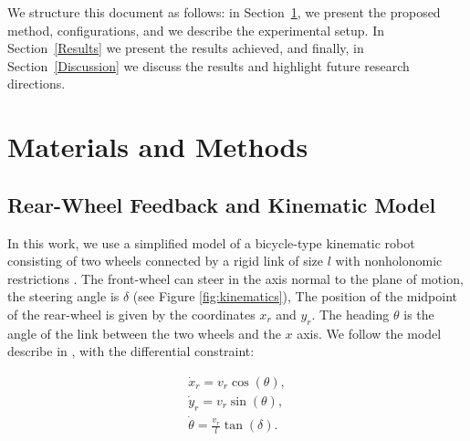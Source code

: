 \documentclass[symmetry,article,submit,moreauthors,pdftex]{Definitions/mdpi}
\begin{document}
We structure this document as follows: in Section~\ref{MatAndMethods}, we
present the proposed method, configurations, and we describe the experimental
setup. In Section~\ref{Results} we present the results achieved, and finally,
in Section~\ref{Discussion} we discuss the results and highlight future
research directions.

 
\section{Materials and Methods}\label{MatAndMethods}

\subsection{Rear-Wheel Feedback and Kinematic Model}\label{sec:kinematic}

In this work, we use a simplified model of a bicycle-type kinematic robot
consisting of two wheels connected by a rigid link of size $l$ with
nonholonomic restrictions \cite{pamucar_vehicle_2018,de1998feedback}.  The
front-wheel can steer in the axis normal to the plane of motion, the steering
angle is $\delta$ (see Figure \ref{fig:kinematics}), The position of the
midpoint of the rear-wheel is given by the coordinates $x_r$ and $y_r$. The
heading $\theta$ is the angle of the link between the two wheels and the $x$
axis.  We follow the model describe in \cite{paden_survey_2016}, with the
differential constraint:

\begin{equation}
    \begin{matrix}
        \dot{x}_{r}  = v_r \cos (\theta),\\ 
        \dot{y}_{r}  = v_r \sin (\theta),\\
        \dot{\theta} = \frac{v_r}{l} \tan (\delta).
    \end{matrix}
\end{equation}
\end{document}
